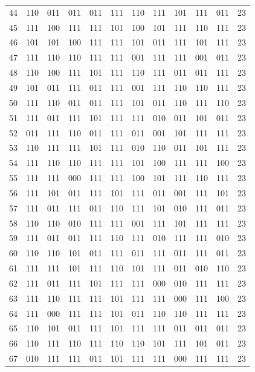 \begin{longtable}{r*{10}{c}r}
44 & 110 & 011 & 011 & 011 & 111 & 110 & 111 & 101 & 111 & 011 & 23\\
45 & 111 & 100 & 111 & 111 & 101 & 100 & 101 & 111 & 110 & 111 & 23\\
46 & 101 & 101 & 100 & 111 & 111 & 101 & 011 & 111 & 101 & 111 & 23\\
47 & 111 & 110 & 110 & 111 & 111 & 001 & 111 & 111 & 001 & 011 & 23\\
48 & 110 & 100 & 111 & 101 & 111 & 110 & 111 & 011 & 011 & 111 & 23\\
49 & 101 & 011 & 111 & 011 & 111 & 001 & 111 & 110 & 110 & 111 & 23\\
50 & 111 & 110 & 011 & 011 & 111 & 101 & 011 & 110 & 111 & 110 & 23\\
51 & 111 & 011 & 111 & 101 & 111 & 111 & 010 & 011 & 101 & 011 & 23\\
52 & 011 & 111 & 110 & 011 & 111 & 011 & 001 & 101 & 111 & 111 & 23\\
53 & 110 & 111 & 111 & 101 & 111 & 010 & 110 & 011 & 101 & 111 & 23\\
54 & 111 & 110 & 110 & 111 & 111 & 101 & 100 & 111 & 111 & 100 & 23\\
55 & 111 & 111 & 000 & 111 & 111 & 100 & 101 & 111 & 110 & 111 & 23\\
56 & 111 & 101 & 011 & 111 & 101 & 111 & 011 & 001 & 111 & 101 & 23\\
57 & 111 & 011 & 111 & 011 & 110 & 111 & 101 & 010 & 111 & 011 & 23\\
58 & 110 & 110 & 010 & 111 & 111 & 001 & 111 & 101 & 111 & 111 & 23\\
59 & 111 & 011 & 011 & 111 & 110 & 111 & 010 & 111 & 111 & 010 & 23\\
60 & 110 & 110 & 101 & 011 & 111 & 011 & 111 & 011 & 111 & 011 & 23\\
61 & 111 & 111 & 101 & 111 & 110 & 101 & 111 & 011 & 010 & 110 & 23\\
62 & 111 & 011 & 111 & 101 & 111 & 111 & 000 & 010 & 111 & 111 & 23\\
63 & 111 & 110 & 111 & 111 & 101 & 111 & 111 & 000 & 111 & 100 & 23\\
64 & 111 & 000 & 111 & 111 & 101 & 011 & 110 & 110 & 111 & 111 & 23\\
65 & 110 & 101 & 011 & 111 & 101 & 111 & 111 & 011 & 011 & 011 & 23\\
66 & 110 & 111 & 110 & 111 & 110 & 110 & 101 & 111 & 101 & 011 & 23\\
67 & 010 & 111 & 111 & 011 & 101 & 111 & 111 & 000 & 111 & 111 & 23\\

\end{longtable}
